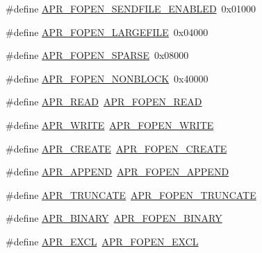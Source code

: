 \begin{DoxyCompactItemize}
\#define \hyperlink{group__apr__file__open__flags_ga60c21e28e4a612d58a874fe2cc71a6e4}{A\+P\+R\+\_\+\+F\+O\+P\+E\+N\+\_\+\+S\+E\+N\+D\+F\+I\+L\+E\+\_\+\+E\+N\+A\+B\+L\+ED}~0x01000
\item 
\#define \hyperlink{group__apr__file__open__flags_gaf6cfaa4789e6264afd186235f0adbc22}{A\+P\+R\+\_\+\+F\+O\+P\+E\+N\+\_\+\+L\+A\+R\+G\+E\+F\+I\+LE}~0x04000
\item 
\#define \hyperlink{group__apr__file__open__flags_ga0d155e9bb7fbf1a5cd4e84b5ede059f4}{A\+P\+R\+\_\+\+F\+O\+P\+E\+N\+\_\+\+S\+P\+A\+R\+SE}~0x08000
\item 
\#define \hyperlink{group__apr__file__open__flags_ga31e4d14068147e43e1778bcf975dda62}{A\+P\+R\+\_\+\+F\+O\+P\+E\+N\+\_\+\+N\+O\+N\+B\+L\+O\+CK}~0x40000
\item 
\#define \hyperlink{group__apr__file__open__flags_ga0021db78d799d1c8825b701c7efee483}{A\+P\+R\+\_\+\+R\+E\+AD}~\hyperlink{group__apr__file__open__flags_gaf9e7303f028b130ff7d4b209d6662d7d}{A\+P\+R\+\_\+\+F\+O\+P\+E\+N\+\_\+\+R\+E\+AD}
\item 
\#define \hyperlink{group__apr__file__open__flags_ga3e427e53aceb1ccdb078d9a03cd63d01}{A\+P\+R\+\_\+\+W\+R\+I\+TE}~\hyperlink{group__apr__file__open__flags_gac598bb95fc9476b0bf2ed0b1c308842c}{A\+P\+R\+\_\+\+F\+O\+P\+E\+N\+\_\+\+W\+R\+I\+TE}
\item 
\#define \hyperlink{group__apr__file__open__flags_gac210e96bc821dbaa83c326e775dad028}{A\+P\+R\+\_\+\+C\+R\+E\+A\+TE}~\hyperlink{group__apr__file__open__flags_gafe94f21ccbf411172e70e7f473af251a}{A\+P\+R\+\_\+\+F\+O\+P\+E\+N\+\_\+\+C\+R\+E\+A\+TE}
\item 
\#define \hyperlink{group__apr__file__open__flags_ga26d3de2bae5c90e5124869f56c141c2e}{A\+P\+R\+\_\+\+A\+P\+P\+E\+ND}~\hyperlink{group__apr__file__open__flags_ga45f353db9b71d4760a3f35cf3781cfc8}{A\+P\+R\+\_\+\+F\+O\+P\+E\+N\+\_\+\+A\+P\+P\+E\+ND}
\item 
\#define \hyperlink{group__apr__file__open__flags_gaa8898fdebd69d3a64286731b713a6dc9}{A\+P\+R\+\_\+\+T\+R\+U\+N\+C\+A\+TE}~\hyperlink{group__apr__file__open__flags_ga09b05a5bd5db534b93794f7657bcb146}{A\+P\+R\+\_\+\+F\+O\+P\+E\+N\+\_\+\+T\+R\+U\+N\+C\+A\+TE}
\item 
\#define \hyperlink{group__apr__file__open__flags_ga0e7556bac0cc0d1dafdf38952a4e4015}{A\+P\+R\+\_\+\+B\+I\+N\+A\+RY}~\hyperlink{group__apr__file__open__flags_gacb20b3028864f34cb26314fe2cacc3fa}{A\+P\+R\+\_\+\+F\+O\+P\+E\+N\+\_\+\+B\+I\+N\+A\+RY}
\item 
\#define \hyperlink{group__apr__file__open__flags_ga209c26b2b903cc23417f6781d4edf891}{A\+P\+R\+\_\+\+E\+X\+CL}~\hyperlink{group__apr__file__open__flags_gabb7fb062cdf1d58faee8c7ea518496f1}{A\+P\+R\+\_\+\+F\+O\+P\+E\+N\+\_\+\+E\+X\+CL}

\end{DoxyCompactItemize}
